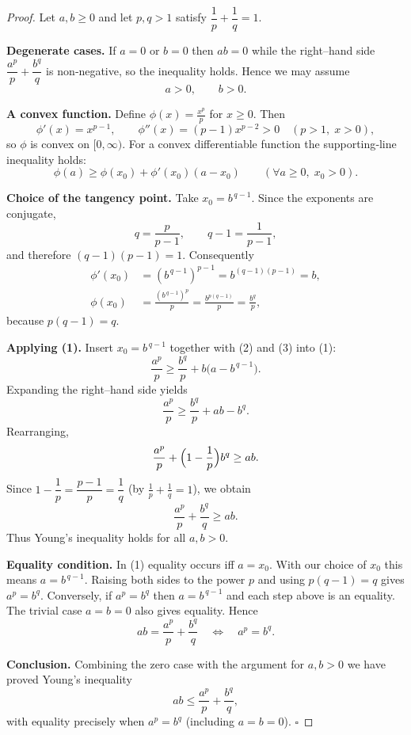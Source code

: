 \begin{proof}
Let \(a,b\ge 0\) and let \(p,q>1\) satisfy \(\dfrac1p+\dfrac1q=1\).

\medskip
\noindent\textbf{Degenerate cases.}
If \(a=0\) or \(b=0\) then \(ab=0\) while the right–hand side  
\(\dfrac{a^{p}}{p}+\dfrac{b^{q}}{q}\) is non‑negative, so the inequality holds.
Hence we may assume
\[
a>0,\qquad b>0 .
\]

\medskip
\noindent\textbf{A convex function.}
Define \(\displaystyle \phi(x)=\frac{x^{p}}{p}\) for \(x\ge 0\).
Then
\[
\phi'(x)=x^{p-1},\qquad 
\phi''(x)=(p-1)x^{p-2}>0\quad (p>1,\;x>0),
\]
so \(\phi\) is convex on \([0,\infty)\).  
For a convex differentiable function the supporting‑line inequality holds:
\begin{equation}
\phi(a)\ge \phi(x_{0})+\phi'(x_{0})(a-x_{0})
\qquad(\forall a\ge0,\;x_{0}>0). \tag{1}
\end{equation}

\medskip
\noindent\textbf{Choice of the tangency point.}
Take \(x_{0}=b^{\,q-1}\).  
Since the exponents are conjugate,
\[
q=\frac{p}{p-1},\qquad q-1=\frac{1}{p-1},
\]
and therefore \((q-1)(p-1)=1\). Consequently
\begin{align}
\phi'(x_{0})&=(b^{\,q-1})^{p-1}=b^{(q-1)(p-1)}=b, \tag{2}\\[4pt]
\phi(x_{0})&=\frac{(b^{\,q-1})^{p}}{p}
          =\frac{b^{p(q-1)}}{p}
          =\frac{b^{q}}{p}, \tag{3}
\end{align}
because \(p(q-1)=q\).

\medskip
\noindent\textbf{Applying (1).}
Insert \(x_{0}=b^{\,q-1}\) together with (2) and (3) into (1):
\[
\frac{a^{p}}{p}
   \ge \frac{b^{q}}{p}+b\bigl(a-b^{\,q-1}\bigr).
\]
Expanding the right–hand side yields
\[
\frac{a^{p}}{p}\ge \frac{b^{q}}{p}+ab-b^{q}.
\]
Rearranging,
\[
\frac{a^{p}}{p}+\Bigl(1-\frac1p\Bigr)b^{q}\ge ab.
\]
Since \(1-\dfrac1p=\dfrac{p-1}{p}=\dfrac1q\) (by \(\frac1p+\frac1q=1\)), we obtain
\begin{equation}
\frac{a^{p}}{p}+\frac{b^{q}}{q}\ge ab. \tag{4}
\end{equation}
Thus Young’s inequality holds for all \(a,b>0\).

\medskip
\noindent\textbf{Equality condition.}
In (1) equality occurs iff \(a=x_{0}\). With our choice of \(x_{0}\) this means
\(a=b^{\,q-1}\). Raising both sides to the power \(p\) and using \(p(q-1)=q\) gives
\(a^{p}=b^{q}\). Conversely, if \(a^{p}=b^{q}\) then \(a=b^{\,q-1}\) and each step
above is an equality. The trivial case \(a=b=0\) also gives equality. Hence
\[
ab=\frac{a^{p}}{p}+\frac{b^{q}}{q}
\quad\Longleftrightarrow\quad a^{p}=b^{q}.
\]

\medskip
\noindent\textbf{Conclusion.}
Combining the zero case with the argument for \(a,b>0\) we have proved Young’s
inequality
\[
ab\le\frac{a^{p}}{p}+\frac{b^{q}}{q},
\]
with equality precisely when \(a^{p}=b^{q}\) (including \(a=b=0\)). \(\square\)
\end{proof}